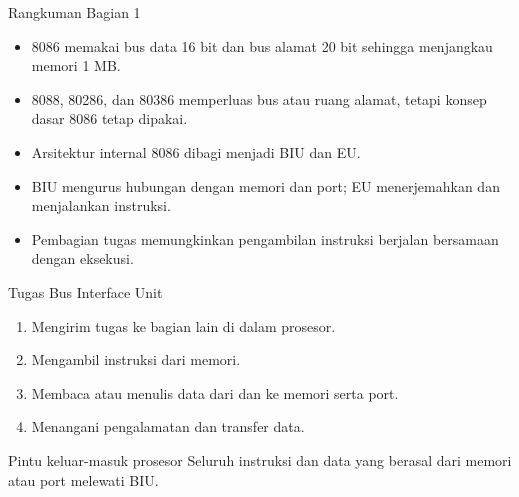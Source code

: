 \documentclass[aspectratio=169,11pt]{beamer}
\begin{document}
\begin{frame}{Rangkuman Bagian 1}
\small
\begin{itemize}
    \item 8086 memakai bus data 16 bit dan bus alamat 20 bit
          sehingga menjangkau memori 1 MB.

    \vspace{0.15em}
    \item 8088, 80286, dan 80386 memperluas bus atau ruang alamat,
          tetapi konsep dasar 8086 tetap dipakai.

    \vspace{0.15em}
    \item Arsitektur internal 8086 dibagi menjadi BIU dan EU.

    \vspace{0.15em}
    \item BIU mengurus hubungan dengan memori dan port; EU
          menerjemahkan dan menjalankan instruksi.

    \vspace{0.15em}
    \item Pembagian tugas memungkinkan pengambilan instruksi
          berjalan bersamaan dengan eksekusi.
\end{itemize}
\end{frame}


\begin{frame}{Tugas Bus Interface Unit}
\small
\begin{enumerate}
    \item Mengirim tugas ke bagian lain di dalam prosesor.

    \vspace{0.18em}
    \item Mengambil instruksi dari memori.

    \vspace{0.18em}
    \item Membaca atau menulis data dari dan ke memori serta port.

    \vspace{0.18em}
    \item Menangani pengalamatan dan transfer data.
\end{enumerate}

\vspace{0.3em}
\begin{block}{Pintu keluar-masuk prosesor}
\small Seluruh instruksi dan data yang berasal dari memori atau port
melewati BIU.
\end{block}
\end{frame}
\end{document}
